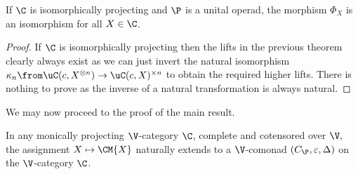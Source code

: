 \documentclass{tac}
\begin{document}
\begin{corollary}
\label{isolift}
    If $\C$ is isomorphically projecting and $\P$ is a unital operad, the morphism $\Phi_X$ is an isomorphism for all $X \in \C$.
\end{corollary}
\begin{proof}
    If $\C$ is isomorphically projecting then the lifts in the previous theorem clearly always exist as we can just invert the natural isomorphism $\kappa_{n}\from \uC(c, X^{\otimes n})\to \uC(c, X)^{\times n}$ to obtain the required higher lifts. There is nothing to prove as the inverse of a natural transformation is always natural.
\end{proof}
We may now proceed to the proof of the main result.
\begin{theorem}
In any monically projecting $\V$-category $\C$, complete and cotensored over $\V,$  the assignment $X \mapsto \CM{X}$ naturally extends to a $\V$-comonad $(C_{\P}, \varepsilon, \Delta)$ on the  $\V$-category $\C$.
\end{theorem}
\end{document}
